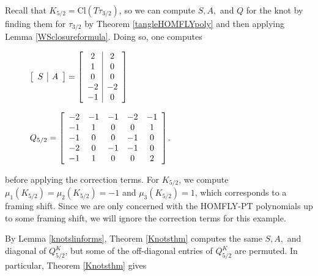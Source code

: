 \documentclass[11pt]{amsart}
\theoremstyle{plain}
\theoremstyle{definition}
\theoremstyle{remark}
\begin{document}
Recall that $K_{5/2}=\text{Cl}(T\tau_{3/2})$, so we can compute $S, A,$ and $Q$ for the knot by finding them for $\tau_{3/2}$ by Theorem \ref{tangleHOMFLYpoly} and then applying Lemma \ref{WSclosureformula}. Doing so, one computes

\begin{figure}[h]
    \centering
\begin{minipage}[b]{.45\textwidth}

$\left[\begin{array}{ c| c }
   S & A \end{array}\right] =
  \left[\begin{array}{ c | c }
    2 & 2 \\
    1 & 0\\
    0 & 0\\
    -2 & -2\\
    -1 & 0\\
   
   
    \end{array}\right]$
    \end{minipage}
    \begin{minipage}[b]{.45\textwidth}
    $ Q_{5/2}=\left[\begin{array}{ c c c c c}
   
    -2 & -1 & -1 & -2 & -1 \\
    -1 & 1 & 0 & 0 & 1 \\
    -1 & 0 & 0 & -1 & 0\\
    -2 & 0 & -1 & -1 & 0\\
    -1 & 1 & 0 & 0 & 2\\
    
    \end{array}\right]$.
    \end{minipage}
\end{figure}
\noindent
before applying the correction terms. For $K_{5/2}$, we compute $\mu_1(K_{5/2})=\mu_2(K_{5/2})=-1$ and $\mu_3(K_{5/2})=1$, which corresponds to a framing shift. Since we are only concerned with the HOMFLY-PT polynomials up to some framing shift, we will ignore the correction terms for this example.

By Lemma \ref{knotslinforms}, Theorem \ref{Knotsthm} computes the same $S, A,$ and diagonal of $Q_{5/2}^K$, but some of the off-diagonal entries of $Q_{5/2}^K$ are permuted. In particular, Theorem \ref{Knotsthm} gives
\end{document}
